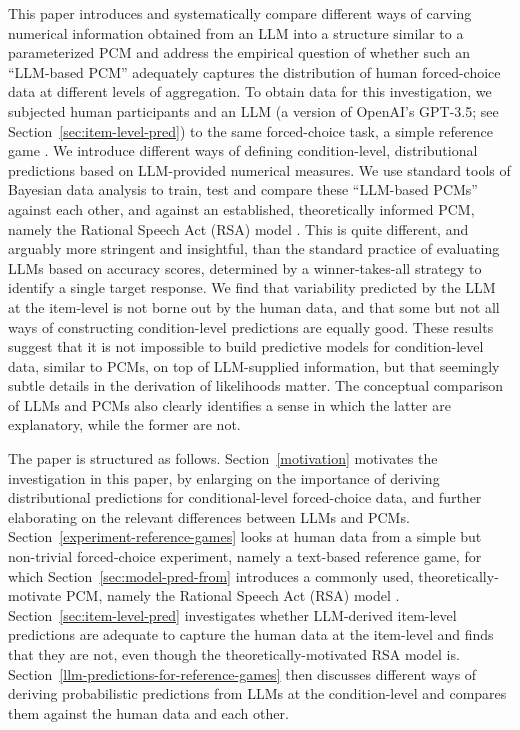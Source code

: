 \documentclass[fleqn]{article}
\begin{document}
This paper introduces and systematically compare different ways of carving numerical information obtained from an LLM into a structure similar to a parameterized PCM and address the empirical question of whether such an ``LLM-based PCM'' adequately captures the distribution of human forced-choice data at different levels of aggregation.
To obtain data for this investigation, we subjected human participants and an LLM (a version of OpenAI's GPT-3.5; see Section~\ref{sec:item-level-pred}) to the same forced-choice task, a simple reference game \citep{FrankGoodman2012:Predicting-Prag}.
We introduce different ways of defining condition-level, distributional predictions based on LLM-provided numerical measures.
We use standard tools of Bayesian data analysis \citep{GelmanCarlin2014:Bayesian-Data-A} to train, test and compare these ``LLM-based PCMs'' against each other, and against an established, theoretically informed PCM, namely the Rational Speech Act (RSA) model \citep{FrankGoodman2012:Predicting-Prag}.
This is quite different, and arguably more stringent and insightful, than the standard practice of evaluating LLMs based on accuracy scores, determined by a winner-takes-all strategy to identify a single target response.
We find that variability predicted by the LLM at the item-level is not borne out by the human data, and that some but not all ways of constructing condition-level predictions are equally good.
These results suggest that it is not impossible to build predictive models for condition-level data, similar to PCMs, on top of LLM-supplied information, but that seemingly subtle details in the derivation of likelihoods matter.
The conceptual comparison of LLMs and PCMs also clearly identifies a sense in which the latter are explanatory, while the former are not. 

The paper is structured as follows.
Section~\ref{motivation} motivates the investigation in this paper, by enlarging on the importance of deriving distributional predictions for conditional-level forced-choice data, and further elaborating on the relevant differences between LLMs and PCMs.
Section~\ref{experiment-reference-games} looks at human data from a simple but non-trivial forced-choice experiment, namely a text-based reference game, for which Section~\ref{sec:model-pred-from} introduces a commonly used, theoretically-motivate PCM, namely the Rational Speech Act (RSA) model \citep{FrankGoodman2012:Predicting-Prag}.
Section~\ref{sec:item-level-pred} investigates whether LLM-derived item-level predictions are adequate to capture the human data at the item-level and finds that they are not, even though the theoretically-motivated RSA model is.
Section~\ref{llm-predictions-for-reference-games} then discusses different ways of deriving probabilistic predictions from LLMs at the condition-level and compares them against the human data and each other.
\end{document}
